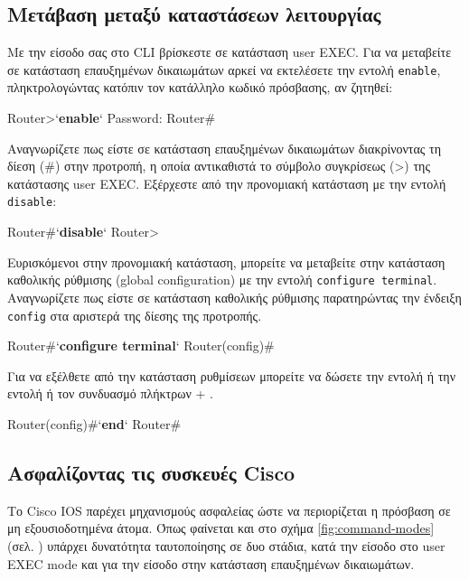 \documentclass{EdipyLabs} %
\begin{document}
\subsection{Μετάβαση μεταξύ καταστάσεων λειτουργίας}
Με την είσοδο σας στο CLI βρίσκεστε σε κατάσταση user EXEC. Για να μεταβείτε σε κατάσταση επαυξημένων δικαιωμάτων αρκεί να εκτελέσετε την εντολή \texttt{enable}, πληκτρολογώντας κατόπιν τον κατάλληλο κωδικό πρόσβασης, αν ζητηθεί:

\begin{CommandBox}
Router>`\textbf{enable}`
Password:
Router#
\end{CommandBox}

Αναγνωρίζετε πως είστε σε κατάσταση επαυξημένων δικαιωμάτων διακρίνοντας τη δίεση (\#) στην προτροπή, η οποία αντικαθιστά το σύμβολο συγκρίσεως (>) της κατάστασης user EXEC. Εξέρχεστε από την προνομιακή κατάσταση με την εντολή \texttt{disable}:

\begin{CommandBox}
Router#`\textbf{disable}`
Router>
\end{CommandBox}

Ευρισκόμενοι στην προνομιακή κατάσταση, μπορείτε να μεταβείτε στην κατάσταση καθολικής ρύθμισης (global configuration) με την εντολή \texttt{configure terminal}. Αναγνωρίζετε πως είστε σε κατάσταση καθολικής ρύθμισης παρατηρώντας την ένδειξη \texttt{config} στα αριστερά της δίεσης της προτροπής.

\begin{CommandBox}
Router#`\textbf{configure terminal}`
Router(config)#
\end{CommandBox}

Για να εξέλθετε από την κατάσταση ρυθμίσεων μπορείτε να δώσετε την εντολή  ή την εντολή  ή τον συνδυασμό πλήκτρων  + .

\begin{CommandBox}
Router(config)#`\textbf{end}`
Router#
\end{CommandBox}

\subsection{Ασφαλίζοντας τις συσκευές Cisco}
Το Cisco IOS παρέχει μηχανισμούς ασφαλείας ώστε να περιορίζεται η πρόσβαση σε μη εξουσιοδοτημένα άτομα. Όπως φαίνεται και στο σχήμα \ref{fig:command-modes} (σελ. \pageref{fig:command-modes}) υπάρχει δυνατότητα ταυτοποίησης σε δυο στάδια, κατά την είσοδο στο user EXEC mode και για την είσοδο στην κατάσταση επαυξημένων δικαιωμάτων. 
\end{document}

